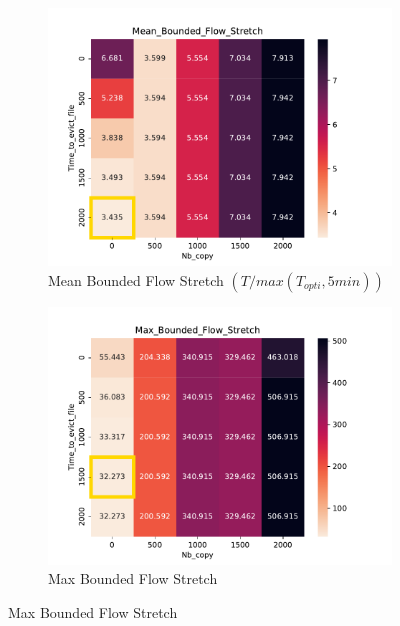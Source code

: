 \documentclass[a4paper]{article}
\begin{document}
\begin{figure}[H]
\begin{subfigure}[b]{0.4\linewidth}\centering\includegraphics[width=1\linewidth]{MBSS/plot/Heatmap_Stretch_with_a_minimum_FCFS_Score_Time_to_evict_file_Nb_copy_2022-01-24->2022-01-24_450_128_32_256_4_1024.pdf}\caption{Mean Bounded Flow Stretch $(T/max(T_{opti}, 5min))$}\end{subfigure}
\begin{subfigure}[b]{0.4\linewidth}\centering\includegraphics[width=1\linewidth]{MBSS/plot/Heatmap_Max_Stretch_with_a_minimum_FCFS_Score_Time_to_evict_file_Nb_copy_2022-01-24->2022-01-24_450_128_32_256_4_1024.pdf}\caption{Max Bounded Flow Stretch}\end{subfigure}

\end{figure}
\end{document}
